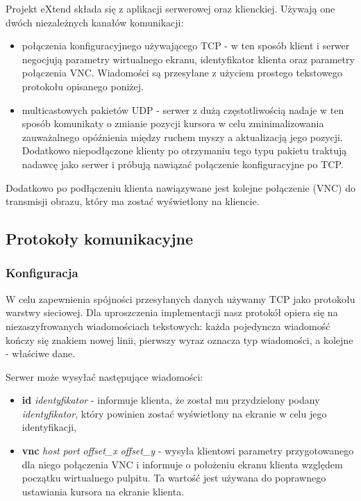     Projekt eXtend składa się z aplikacji serwerowej oraz klienckiej. Używają one dwóch niezależnych kanałów komunikacji:
    \begin{itemize}
      \item połączenia konfiguracyjnego używającego TCP - w ten sposób klient i serwer negocjują parametry wirtualnego ekranu, identyfikator klienta oraz parametry połączenia VNC. Wiadomości są przesyłane z użyciem prostego tekstowego protokołu opisanego poniżej.
      \item multicastowych pakietów UDP - serwer z dużą częstotliwością nadaje w ten sposób komunikaty o zmianie pozycji kursora w celu zminimalizowania zauważalnego opóźnienia między ruchem myszy a aktualizacją jego pozycji. Dodatkowo niepodłączone klienty po otrzymaniu tego typu pakietu traktują nadawcę jako serwer i próbują nawiązać połączenie konfiguracyjne po TCP.
    \end{itemize}

    Dodatkowo po podłączeniu klienta nawiązywane jest kolejne połączenie (VNC) do transmisji obrazu, który ma zostać wyświetlony na kliencie.


  \subsection{Protokoły komunikacyjne}

    \subsubsection{Konfiguracja}

      W celu zapewnienia spójności przesyłanych danych używamy TCP jako protokołu warstwy sieciowej. Dla uproszczenia implementacji nasz protokół opiera się na niezaszyfrowanych wiadomościach tekstowych: każda pojedyncza wiadomość kończy się znakiem nowej linii, pierwszy wyraz oznacza typ wiadomości, a kolejne - właściwe dane.

      Serwer może wysyłać następujące wiadomości:
      \begin{itemize}
        \item \textbf{id} \emph{identyfikator} - informuje klienta, że został mu przydzielony podany \emph{identyfikator}, który powinien zostać wyświetlony na ekranie w celu jego identyfikacji,
        \item \textbf{vnc} \emph{host} \emph{port} \emph{offset\_x} \emph{offset\_y} - wysyła klientowi parametry przygotowanego dla niego połączenia VNC i informuje o położeniu ekranu klienta względem początku wirtualnego pulpitu. Ta wartość jest używana do poprawnego ustawiania kursora na ekranie klienta.
      \end{itemize}

